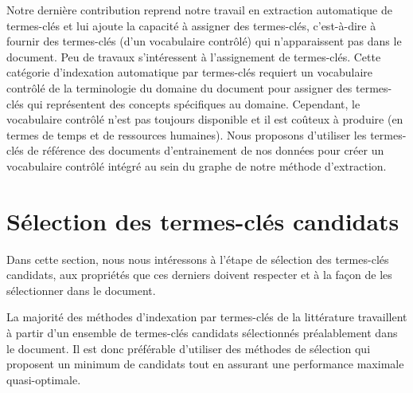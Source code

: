     Notre dernière contribution reprend notre travail en extraction automatique
    de termes-clés et lui ajoute la capacité à assigner des termes-clés,
    c'est-à-dire à fournir des termes-clés (d'un vocabulaire contrôlé) qui
    n'apparaissent pas dans le document. Peu de travaux s'intéressent à
    l'assignement de termes-clés. Cette catégorie d'indexation automatique par
    termes-clés requiert un vocabulaire contrôlé de la terminologie du domaine
    du document pour assigner des termes-clés qui représentent des concepts
    spécifiques au domaine. Cependant, le vocabulaire contrôlé n'est pas
    toujours disponible et il est coûteux à produire (en termes de temps et de
    ressources humaines). Nous proposons d'utiliser les termes-clés de référence
    des documents d'entrainement de nos données pour créer un vocabulaire
    contrôlé intégré au sein du graphe de notre méthode d'extraction.


  \section{Sélection des termes-clés candidats }
  \label{sec:main-automatic_keyphrase_annotation-keyphrase_candidate_selection}
    Dans cette section, nous nous intéressons à l'étape de sélection des
    termes-clés candidats, aux propriétés que ces derniers doivent respecter et
    à la façon de les sélectionner dans le document.

    La majorité des méthodes d'indexation par termes-clés de la littérature
    travaillent à partir d'un ensemble de termes-clés candidats sélectionnés
    préalablement dans le document.  Il est
    donc préférable d'utiliser des méthodes de sélection qui proposent un
    minimum de candidats tout en assurant une performance maximale
    quasi-optimale.

